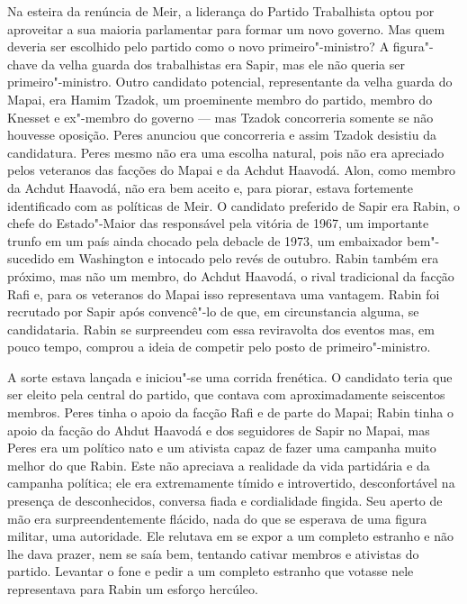 Na esteira da renúncia de Meir, a liderança do Partido Trabalhista optou
por aproveitar a sua maioria parlamentar para formar um novo governo.
Mas quem deveria ser escolhido pelo partido como o novo primeiro"-ministro?
A figura"-chave da velha guarda dos trabalhistas era Sapir, mas
ele não queria ser primeiro"-ministro. Outro candidato potencial,
representante da velha guarda do Mapai, era Hamim Tzadok, um proeminente
membro do partido, membro do Knesset e ex"-membro do governo
--- mas Tzadok concorreria somente se não houvesse oposição. Peres
anunciou que concorreria e assim Tzadok desistiu da candidatura. Peres
mesmo não era uma escolha natural, pois não era apreciado pelos
veteranos das facções do Mapai e da Achdut Haavodá. Alon, como membro da
Achdut Haavodá, não era bem aceito e, para piorar, estava fortemente
identificado com as políticas de Meir. O candidato preferido de Sapir
era Rabin, o chefe do Estado"-Maior das  responsável pela vitória de
1967, um importante trunfo em um país ainda chocado pela debacle de
1973, um embaixador bem"-sucedido em Washington e intocado pelo revés de
outubro. Rabin também era próximo, mas não um membro, do Achdut Haavodá,
o rival tradicional da facção Rafi e, para os veteranos do Mapai isso
representava uma vantagem. Rabin foi recrutado por Sapir após
convencê"-lo de que, em circunstancia alguma, se candidataria. Rabin se
surpreendeu com essa reviravolta dos eventos mas, em pouco tempo,
comprou a ideia de competir pelo posto de primeiro"-ministro.

A sorte estava lançada e iniciou"-se uma corrida frenética. O candidato
teria que ser eleito pela central do partido, que contava com
aproximadamente seiscentos membros. Peres tinha o apoio da facção Rafi e
de parte do Mapai; Rabin tinha o apoio da facção do Ahdut Haavodá e dos
seguidores de Sapir no Mapai, mas Peres era um político nato e um
ativista capaz de fazer uma campanha muito melhor do que Rabin. Este não
apreciava a realidade da vida partidária e da campanha política; ele era
extremamente tímido e introvertido, desconfortável na presença de
desconhecidos, conversa fiada e cordialidade fingida. Seu aperto de mão
era surpreendentemente flácido, nada do que se esperava de uma figura
militar, uma autoridade. Ele relutava em se expor a um completo estranho
e não lhe dava prazer, nem se saía bem, tentando cativar membros e
ativistas do partido. Levantar o fone e pedir a um completo estranho que
votasse nele representava para Rabin um esforço hercúleo.

